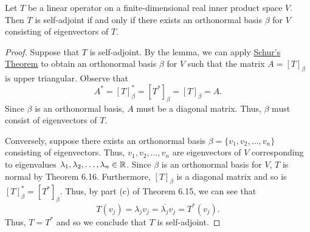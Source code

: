 \begin{theorem}\label{Theorem 6.17}
    Let \( T  \) be a linear operator on a finite-dimensional real inner product space \( V  \). Then \( T  \) is self-adjoint if and only if there exists an orthonormal basis \( \beta \) for \( V  \) consisting of eigenvectors of \( T  \).
\end{theorem}

\begin{proof}
Suppose that \( T  \) is self-adjoint. By the lemma, we can apply {\hyperref[Schur]{Schur's Theorem}} to obtain an orthonormal basis \( \beta  \) for \( V  \) such that the matrix \( A = [T]_{\beta} \) is upper triangular. Observe that
\[  A^{*} = [T]_{\beta}^{*} = [T^{*}]_{\beta} = [T]_{\beta} = A. \]
Since \( \beta \) is an orthonormal basis, \( A  \) must be a diagonal matrix. Thus, \( \beta  \) must consist of eigenvectors of \( T  \).

Conversely, suppose there exists an orthonormal basis \( \beta = \{ {v}_{1}, {v}_{2}, \dots, {v}_{n} \}  \) consisting of eigenvectors. Thus, \( {v}_{1}, {v}_{2}, \dots, {v}_{n} \) are eigenvectors of \( V  \) corresponding to eigenvalues \( {\lambda}_{1}, {\lambda}_{2}, \dots, {\lambda}_{n} \in \mathbb{R}  \). Since \(  \beta  \) is an orthonormal basis for \( V  \), \( T  \) is normal by Theorem 6.16. Furthermore, \( [T]_{\beta} \) is a diagonal matrix and so is \( [T]_{\beta}^{*} = [T^{*}]_{\beta} \). Thus, by part (c) of Theorem 6.15, we can see that  
\[  T({v}_{j}) = {\lambda}_{j} {v}_{j} = \overline{\lambda_j} {v}_{j} = T^{*}({v}_{j}). \]
Thus, \( T = T^{*}  \) and so we conclude that \( T  \) is self-adjoint.
\end{proof}
